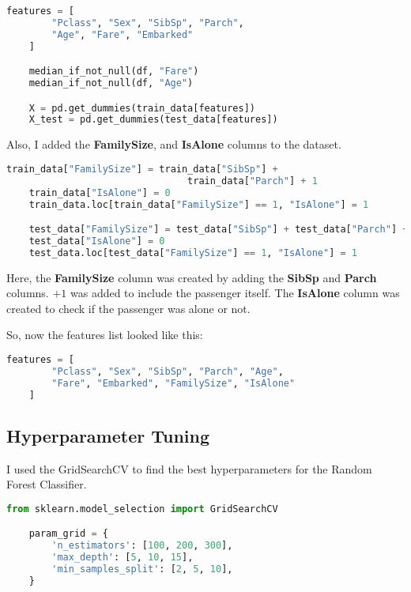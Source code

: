 \documentclass{exam}
\begin{document}
\begin{questions}
\begin{TheSolution}
        \begin{lstlisting}[language=Python]
    features = [
        "Pclass", "Sex", "SibSp", "Parch",
        "Age", "Fare", "Embarked"
    ]

    median_if_not_null(df, "Fare")
    median_if_not_null(df, "Age")

    X = pd.get_dummies(train_data[features])
    X_test = pd.get_dummies(test_data[features])
        \end{lstlisting}

        Also, I added the \textbf{FamilySize}, and \textbf{IsAlone} columns to the dataset.

        \begin{lstlisting}[language=Python]
    train_data["FamilySize"] = train_data["SibSp"] +
                                train_data["Parch"] + 1
    train_data["IsAlone"] = 0
    train_data.loc[train_data["FamilySize"] == 1, "IsAlone"] = 1

    test_data["FamilySize"] = test_data["SibSp"] + test_data["Parch"] + 1
    test_data["IsAlone"] = 0
    test_data.loc[test_data["FamilySize"] == 1, "IsAlone"] = 1
        \end{lstlisting}

        Here, the \textbf{FamilySize} column was created by adding the \textbf{SibSp} and \textbf{Parch} columns. $+1$ was added to include the passenger itself. The \textbf{IsAlone} column was created to check if the passenger was alone or not.

        So, now the features list looked like this:

        \begin{lstlisting}[language=Python]
    features = [
        "Pclass", "Sex", "SibSp", "Parch", "Age",
        "Fare", "Embarked", "FamilySize", "IsAlone"
    ]
        \end{lstlisting}

        \subsection{Hyperparameter Tuning}

        I used the GridSearchCV to find the best hyperparameters for the Random Forest Classifier.

        \begin{lstlisting}[language=Python]
    from sklearn.model_selection import GridSearchCV

    param_grid = {
        'n_estimators': [100, 200, 300],
        'max_depth': [5, 10, 15],
        'min_samples_split': [2, 5, 10],
    }


\end{lstlisting}
\end{TheSolution}
\end{questions}
\end{document}
